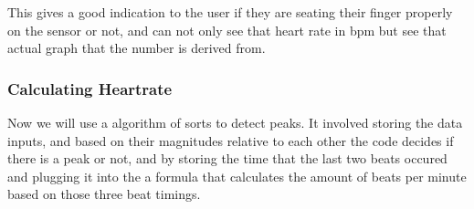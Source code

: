 \documentclass{article}
\begin{document}
\begin{center}
\end{center}
This gives a good indication to the user if they are seating their finger properly on the sensor or not, and can not only see that heart rate in bpm but see that actual graph that the number is derived from.
\newpage
\subsubsection{Calculating Heartrate}
Now we will use a algorithm of sorts to detect peaks. It involved storing the data inputs, and based on their magnitudes relative to each other the code decides if there is a peak or not, and by storing the time that the last two beats occured and plugging it into the a formula that calculates the amount of beats per minute based on those three beat timings.
\end{document}
